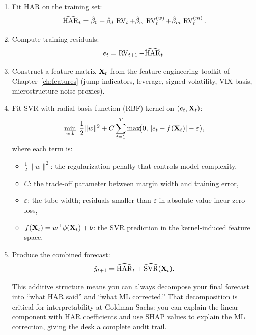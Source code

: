 \begin{enumerate}
  \item Fit HAR on the training set:
        \begin{equation}\label{eq:har-fit-hybrid}
          \widehat{\operatorname{HAR}}_t = \hat{\beta}_0
            + \hat{\beta}_d\,\operatorname{RV}_{t}
            + \hat{\beta}_w\,\operatorname{RV}_{t}^{(w)}
            + \hat{\beta}_m\,\operatorname{RV}_{t}^{(m)}.
        \end{equation}
  \item Compute training residuals:
        \begin{equation}\label{eq:har-resid}
          e_t = \operatorname{RV}_{t+1} - \widehat{\operatorname{HAR}}_t.
        \end{equation}

  \item Construct a feature matrix $\mathbf{X}_t$ from the feature engineering
        toolkit of Chapter~\ref{ch:features} (jump indicators, leverage,
        signed volatility, VIX basis, microstructure noise proxies).
  \item Fit SVR with radial basis function (RBF) kernel on $(e_t, \mathbf{X}_t)$:
        \begin{equation}\label{eq:svr-loss}
          \min_{w,b}\;\frac{1}{2}\|w\|^2
            + C\sum_{t=1}^{T}\max\!\bigl(0,\,|e_t - f(\mathbf{X}_t)| - \varepsilon\bigr),
        \end{equation}
        where each term is:
        \begin{itemize}
          \item $\frac{1}{2}\|w\|^2$: the regularization penalty that
                controls model complexity,
          \item $C$: the trade-off parameter between margin width and
                training error,
          \item $\varepsilon$: the tube width; residuals smaller than
                $\varepsilon$ in absolute value incur zero loss,
          \item $f(\mathbf{X}_t) = w^\top \phi(\mathbf{X}_t) + b$: the SVR prediction
                in the kernel-induced feature space.
        \end{itemize}

  \item Produce the combined forecast:
        \begin{equation}\label{eq:har-svr-combined}
          \hat{y}_{t+1} = \widehat{\operatorname{HAR}}_t + \widehat{\text{SVR}}(\mathbf{X}_t).
        \end{equation}

        \begin{projectconnection}
        This additive structure means you can always decompose your final
        forecast into ``what HAR said'' and ``what ML corrected.''  That
        decomposition is critical for interpretability at Goldman Sachs:
        you can explain the linear component with HAR coefficients and
        use SHAP values to explain the ML correction, giving the desk a
        complete audit trail.
        \end{projectconnection}
\end{enumerate}

